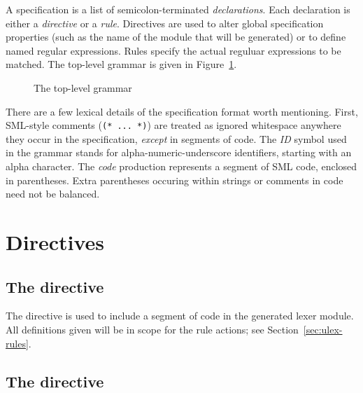 A \ulex{} specification is a list of semicolon-terminated \emph{declarations}.  Each declaration is either a \emph{directive} or a \emph{rule}.  Directives are used to alter global specification properties (such as the name of the module that will be generated) or to define named regular expressions.  Rules specify the actual reguluar expressions to be matched.  The top-level grammar is given in Figure~\ref{fig:ulex-syntax}.

\begin{figure}
\caption{The top-level \ulex{} grammar}\label{fig:ulex-syntax}
\end{figure}

There are a few lexical details of the specification format worth mentioning.  First, SML-style comments (\texttt{(* ... *)}) are treated as ignored whitespace anywhere they occur in the specification, \emph{except} in segments of code.  The \textit{ID} symbol used in the grammar stands for alpha-numeric-underscore identifiers, starting with an alpha character.  The \textit{code} production represents a segment of SML code, enclosed in parentheses.  Extra parentheses occuring within strings or comments in code need not be balanced.

\section{Directives}

\subsection{The  directive}

The  directive is used to include a segment of code in the generated lexer module.  All definitions given will be in scope for the rule actions; see Section~\ref{sec:ulex-rules}.

\subsection{The  directive}

